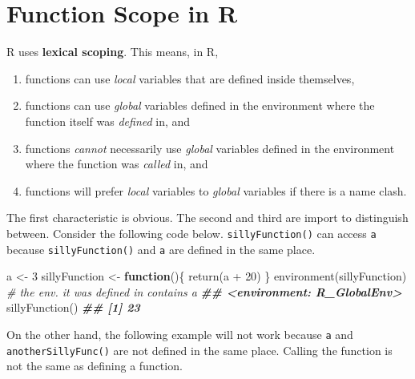 \documentclass[
  12pt,
  krantz2]{krantz}
\makeatletter
\newenvironment{Shaded}{\begin{snugshade}}{\end{snugshade}}
\newcommand{\CommentTok}[1]{\textcolor[rgb]{0.37,0.37,0.37}{\textit{#1}}}
\newcommand{\ControlFlowTok}[1]{\textcolor[rgb]{0.27,0.27,0.27}{\textbf{#1}}}
\newcommand{\DecValTok}[1]{\textcolor[rgb]{0.06,0.06,0.06}{#1}}
\newcommand{\DocumentationTok}[1]{\textcolor[rgb]{0.37,0.37,0.37}{\textbf{\textit{#1}}}}
\newcommand{\FunctionTok}[1]{\textcolor[rgb]{0,0,0}{#1}}
\newcommand{\NormalTok}[1]{#1}
\newcommand{\OtherTok}[1]{\textcolor[rgb]{0.37,0.37,0.37}{#1}}
\newcommand{\SpecialCharTok}[1]{\textcolor[rgb]{0,0,0}{#1}}
\providecommand{\tightlist}{%
  \setlength{\itemsep}{0pt}\setlength{\parskip}{0pt}}
\newenvironment{kframe}{%
\medskip{}
\setlength{\fboxsep}{.8em}
 \def\at@end@of@kframe{}%
 \ifinner\ifhmode%
  \def\at@end@of@kframe{\end{minipage}}%
  \begin{minipage}{\columnwidth}%
 \fi\fi%
 \def\FrameCommand##1{\hskip\@totalleftmargin \hskip-\fboxsep
 \colorbox{shadecolor}{##1}\hskip-\fboxsep
     \hskip-\linewidth \hskip-\@totalleftmargin \hskip\columnwidth}%
 \MakeFramed {\advance\hsize-\width
   \@totalleftmargin\z@ \linewidth\hsize
   \@setminipage}}%
 {\par\unskip\endMakeFramed%
 \at@end@of@kframe}
\renewenvironment{Shaded}{\begin{kframe}}{\end{kframe}}
\makeatother
\begin{document}
\hypertarget{function-scope-in-r}{%
\section{Function Scope in R}\label{function-scope-in-r}}

R uses \textbf{lexical scoping}. This means, in R, 

\begin{enumerate}
\def\labelenumi{\arabic{enumi}.}
\tightlist
\item
  functions can use \emph{local} variables that are defined inside themselves,\\
\item
  functions can use \emph{global} variables defined in the environment where the function itself was \emph{defined} in, and
\item
  functions \emph{cannot} necessarily use \emph{global} variables defined in the environment where the function was \emph{called} in, and
\item
  functions will prefer \emph{local} variables to \emph{global} variables if there is a name clash.
\end{enumerate}

The first characteristic is obvious. The second and third are import to distinguish between. Consider the following code below. \texttt{sillyFunction()} can access \texttt{a} because \texttt{sillyFunction()} and \texttt{a} are defined in the same place.

\begin{Shaded}
\begin{Highlighting}[]
\NormalTok{a }\OtherTok{\textless{}{-}} \DecValTok{3}
\NormalTok{sillyFunction }\OtherTok{\textless{}{-}} \ControlFlowTok{function}\NormalTok{()\{}
  \FunctionTok{return}\NormalTok{(a }\SpecialCharTok{+} \DecValTok{20}\NormalTok{) }
\NormalTok{\}}
\FunctionTok{environment}\NormalTok{(sillyFunction) }\CommentTok{\# the env. it was defined in contains a}
\DocumentationTok{\#\# \textless{}environment: R\_GlobalEnv\textgreater{}}
\FunctionTok{sillyFunction}\NormalTok{()}
\DocumentationTok{\#\# [1] 23}
\end{Highlighting}
\end{Shaded}

On the other hand, the following example will not work because \texttt{a} and \texttt{anotherSillyFunc()} are not defined in the same place. Calling the function is not the same as defining a function.
\end{document}
